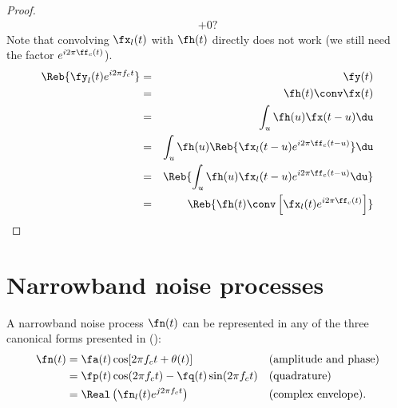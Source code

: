 \begin{proof}
\begin{eqnarray*}
        + 0 ?
\end{eqnarray*}
\attention
Note that convolving $\fx_l(t)$ with $\fh(t)$ directly does
not work (we still need the factor $e^{i2\pi \ff_c(t)}$).
\begin{eqnarray*}
   \Reb{ \fy_l(t)e^{i2\pi f_ct}}
     &=& \fy(t)
   \\&=& \fh(t) \conv \fx(t)
   \\&=& \int_u \fh(u)\fx(t-u)\du
   \\&=& \int_u \fh(u)
                \Reb{ \fx_l(t-u)e^{i2\pi \ff_c(t-u)}} \du
   \\&=& \Reb{ \int_u \fh(u)
                \fx_l(t-u)e^{i2\pi \ff_c(t-u)} \du }
   \\&=& \Reb{ \fh(t)\conv\left[\fx_l(t)e^{i2\pi \ff_c(t)}\right]}
\end{eqnarray*}
\end{proof}



\section{Narrowband noise processes}
A narrowband noise process $\fn(t)$ can be represented in any of the
three canonical forms presented in 
():
\begin{align*}
   \fn(t)
     &= \fa(t)\cos[2\pi f_ct + \theta(t)]
     && \text{(amplitude and phase)}
   \\&= \fp(t)\cos(2\pi f_ct) - \fq(t) \sin(2\pi f_c t)
     && \text{(quadrature)}
   \\&= \Real\left(\fn_l(t)e^{j2\pi f_ct}\right)
     && \text{(complex envelope).}
\end{align*}



